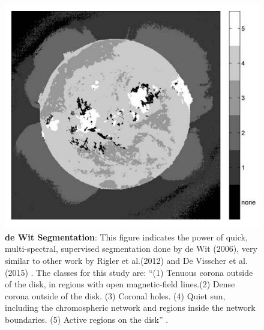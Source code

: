 \documentclass[twoside]{report}
\begin{document}
\begin{figure}[ht]
  \begin{center}
    \includegraphics[scale=1]{dewit.png}
    \caption{{\bf de Wit Segmentation}: This figure indicates the power of quick, multi-spectral, supervised segmentation done by de Wit (2006), very similar to other work by Rigler et al.(2012) and De Visscher et al.(2015) \cite{dewit:2006}. The classes for this study are: ``(1) Tenuous corona outside of the disk, in regions with open magnetic-field lines.(2) Dense corona outside of the disk. (3) Coronal holes. (4) Quiet sun, including the chromospheric network and regions inside the network boundaries. (5) Active regions on the disk'' \cite{dewit:2006}. }
    \label{fig:dewit}
 \end{center}
\end{figure}
\end{document}
